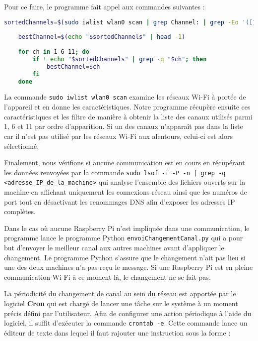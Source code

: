 \documentclass[a4paper,11pt]{article}
\begin{document}
\quad
\newpage

Pour ce faire, le programme fait appel aux commandes suivantes : 

\begin{lstlisting}[language=bash]
    sortedChannels=$(sudo iwlist wlan0 scan | grep Channel: | grep -Eo '([1,6,11])'| sort | uniq -c | sort -n | awk '{print $2}')
    
    bestChannel=$(echo "$sortedChannels" | head -1)
    
    for ch in 1 6 11; do
    	if ! echo "$sortedChannels" | grep -q "$ch"; then
    		bestChannel=$ch
    	fi
    done
\end{lstlisting}

La commande \texttt{sudo iwlist wlan0 scan} examine les réseaux Wi-Fi à portée de l'appareil et en donne les caractéristiques. Notre programme récupère ensuite ces caractéristiques et les filtre de manière à obtenir la liste des canaux utilisés parmi 1, 6 et 11 par ordre d'apparition. Si un des canaux n’apparaît pas dans la liste car il n'est pas utilisé par les réseaux Wi-Fi aux alentours, celui-ci est alors sélectionné.

\quad

Finalement, nous vérifions si aucune communication est en cours en récupérant les données renvoyées par la commande \texttt{sudo lsof -i -P -n | grep -q <adresse\_IP\_de\_la\_machine>} qui analyse l'ensemble des fichiers ouverts sur la machine en affichant uniquement les connexions réseau ainsi que les numéros de port tout en désactivant les renommages DNS afin d'exposer les adresses IP complètes.

\quad

Dans le cas où aucune Raspberry Pi n'est impliquée dans une communication, le programme lance le programme Python \texttt{envoiChangementCanal.py} qui a pour but d'envoyer le meilleur canal aux autres machines avant d'appliquer le changement. Le programme Python s'assure que le changement n'ait pas lieu si une des deux machines n'a pas reçu le message. Si une Raspberry Pi est en pleine communication Wi-Fi à ce moment-là, le changement ne se fait pas. 

\quad

La périodicité du changement de canal au sein du réseau est apportée par le logiciel \textbf{Cron} qui est chargé de lancer une tâche sur le système à un moment précis défini par l'utilisateur. Afin de configurer une action périodique à l'aide du logiciel, il suffit d'exécuter la commande \texttt{crontab -e}. Cette commande lance un éditeur de texte dans lequel il faut rajouter une instruction sous la forme :
\end{document}
